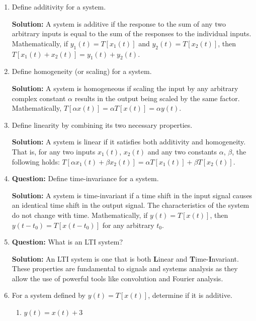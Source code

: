 \documentclass[nohyper,nobib,xcolor=dvipsnames,svgnames,x11names]{tufte-book}
\begin{document}
\begin{enumerate}

\item  Define additivity for a system. 

\textbf{Solution:} A system is additive if the response to the sum of any two arbitrary inputs is equal to the sum of the responses to the individual inputs. Mathematically, if $y_1(t) = T[x_1(t)]$ and $y_2(t) = T[x_2(t)]$, then $T[x_1(t) + x_2(t)] = y_1(t) + y_2(t)$.

\item Define homogeneity (or scaling) for a system.

\textbf{Solution:} A system is homogeneous if scaling the input by any arbitrary complex constant $\alpha$ results in the output being scaled by the same factor. Mathematically, $T[\alpha x(t)] = \alpha T[x(t)] = \alpha y(t)$.

\item Define linearity by combining its two necessary properties.

\textbf{Solution:} A system is linear if it satisfies both additivity and homogeneity. That is, for any two inputs $x_1(t)$, $x_2(t)$ and any two constants $\alpha$, $\beta$, the following holds: $T[\alpha x_1(t) + \beta x_2(t)] = \alpha T[x_1(t)] + \beta T[x_2(t)]$.

\item \textbf{Question:} Define time-invariance for a system. 

\textbf{Solution:} A system is time-invariant if a time shift in the input signal causes an identical time shift in the output signal. The characteristics of the system do not change with time. Mathematically, if $y(t) = T[x(t)]$, then $y(t - t_0) = T[x(t - t_0)]$ for any arbitrary $t_0$.

\item \textbf{Question:} What is an LTI system?

\textbf{Solution:} An LTI system is one that is both \textbf{L}inear and \textbf{T}ime-\textbf{I}nvariant. These properties are fundamental to signals and systems analysis as they allow the use of powerful tools like convolution and Fourier analysis.


\item For a system defined by $y(t) = T[x(t)]$, determine if it is additive.

\begin{enumerate}

\item $y(t) = x(t) + 3$ 


\end{enumerate}
\end{enumerate}
\end{document}
